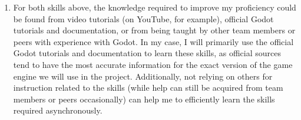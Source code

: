 \documentclass[12pt, titlepage]{article}
\begin{document}
\begin{enumerate}
	acquire the skill of executing automated unit tests of GDScript code with 
	GitHub Actions or CI/CD pipelines, since it is required for the project.
	\item For both skills above, the knowledge required to improve my 
	proficiency could be found from video tutorials (on YouTube, for example), 
	official Godot tutorials and documentation, or from being taught by other 
	team members or peers with experience with Godot. In my case, I will 
	primarily use the official Godot tutorials and documentation to learn these 
	skills, as official sources tend to have the most accurate information for 
	the exact version of the game engine we will use in the project. 
	Additionally, not relying on others for instruction related to the skills 
	(while help can still be acquired from team members or peers occasionally) 
	can help me to efficiently learn the skills required asynchronously.
\end{enumerate}
\end{document}
